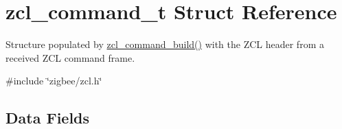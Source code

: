 \hypertarget{structzcl__command__t}{\section{zcl\-\_\-command\-\_\-t Struct Reference}
\label{structzcl__command__t}
}


Structure populated by \hyperlink{group__zcl_gadeb35ab493fffec9ba1c33f658929136}{zcl\-\_\-command\-\_\-build()} with the Z\-C\-L header from a received Z\-C\-L command frame.  




{\ttfamily \#include \char`\"{}zigbee/zcl.\-h\char`\"{}}

\subsection*{Data Fields}
